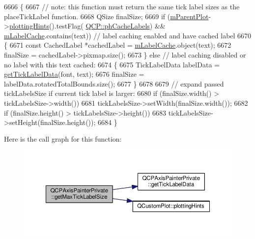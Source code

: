 \begin{DoxyCode}
6666 \{
6667   \textcolor{comment}{// note: this function must return the same tick label sizes as the placeTickLabel function.}
6668   QSize finalSize;
6669   \textcolor{keywordflow}{if} (\hyperlink{class_q_c_p_axis_painter_private_a882029a5f2d4abd71289d415c9b90a28}{mParentPlot}->\hyperlink{class_q_custom_plot_a130b55e205697a5288081e9fc11e443e}{plottingHints}().testFlag(
      \hyperlink{namespace_q_c_p_a5400e5fcb9528d92002ddb938c1f4ef4a8e9cfe5ee0c5cd36dd7accf9739aff65}{QCP::phCacheLabels}) && \hyperlink{class_q_c_p_axis_painter_private_a07ac270ea0c0ae084debd48d6a740e35}{mLabelCache}.contains(text)) \textcolor{comment}{// label caching enabled
       and have cached label}
6670   \{
6671     \textcolor{keyword}{const} CachedLabel *cachedLabel = \hyperlink{class_q_c_p_axis_painter_private_a07ac270ea0c0ae084debd48d6a740e35}{mLabelCache}.object(text);
6672     finalSize = cachedLabel->pixmap.size();
6673   \} \textcolor{keywordflow}{else} \textcolor{comment}{// label caching disabled or no label with this text cached:}
6674   \{
6675     TickLabelData labelData = \hyperlink{class_q_c_p_axis_painter_private_ad9f24fbcbf9d8c92b34d9d00b010e6a3}{getTickLabelData}(font, text);
6676     finalSize = labelData.rotatedTotalBounds.size();
6677   \}
6678   
6679   \textcolor{comment}{// expand passed tickLabelsSize if current tick label is larger:}
6680   \textcolor{keywordflow}{if} (finalSize.width() > tickLabelsSize->width())
6681     tickLabelsSize->setWidth(finalSize.width());
6682   \textcolor{keywordflow}{if} (finalSize.height() > tickLabelsSize->height())
6683     tickLabelsSize->setHeight(finalSize.height());
6684 \}
\end{DoxyCode}


Here is the call graph for this function\+:\nopagebreak
\begin{figure}[H]
\begin{center}
\leavevmode
\includegraphics[width=350pt]{class_q_c_p_axis_painter_private_a8a7c82303e272485621fde78a5b674f9_cgraph}
\end{center}
\end{figure}




